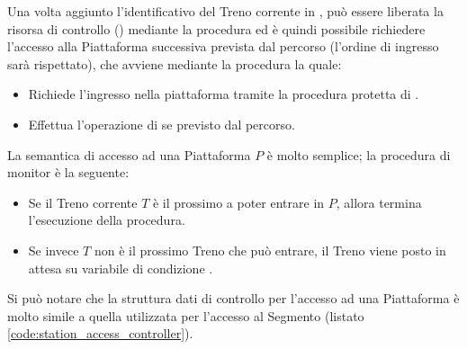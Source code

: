 \begin{description}
\begin{lstlisting}[caption=\small{Esempio di procedure \ttt{Add\_Train} per l'accesso alla Piattaforma.},label=code:platform_add_train]
\end{lstlisting}
		Una volta aggiunto l'identificativo del Treno corrente in , può essere liberata la risorsa di controllo () mediante la procedura  ed è quindi possibile richiedere l'accesso alla Piattaforma successiva prevista dal percorso (l'ordine di ingresso sarà rispettato), che avviene mediante la procedura  la quale:
		\begin{itemize}
			\item Richiede l'ingresso nella piattaforma tramite la procedura protetta  di .
			\item Effettua l'operazione di  se previsto dal percorso.
		\end{itemize}
La semantica di accesso ad una Piattaforma $P$ è molto semplice; la procedura di monitor  è la seguente:
		\begin{itemize}
			\item Se il Treno corrente $T$ è il prossimo a poter entrare in $P$, allora termina l'esecuzione della procedura.
			\item Se invece $T$ non è il prossimo Treno che può entrare, il Treno viene posto in attesa su variabile di condizione .
		\end{itemize}

Si può notare che la struttura dati di controllo per l'accesso ad una Piattaforma è molto simile a quella utilizzata per l'accesso al Segmento (listato \ref{code:station_access_controller}).
		

\end{description}
